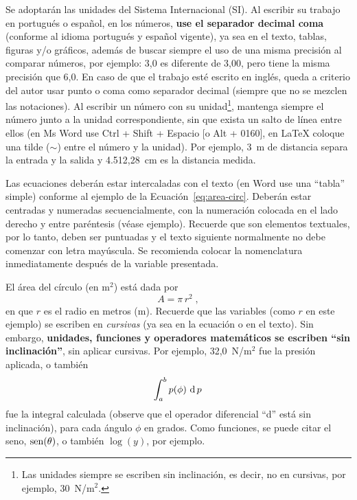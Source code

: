 Se adoptarán las unidades del Sistema Internacional (SI). Al escribir su trabajo en portugués o español, en los números, \textbf{use el separador decimal coma} (conforme al idioma portugués y español vigente), ya sea en el texto, tablas, figuras y/o gráficos, además de buscar siempre el uso de una misma precisión al comparar números, por ejemplo: 3,0 es diferente de 3,00, pero tiene la misma precisión que 6,0.
En caso de que el trabajo esté escrito en inglés, queda a criterio del autor usar punto o coma como separador decimal (siempre que no se mezclen las notaciones).
Al escribir un número con su unidad\footnote{Las unidades siempre se escriben sin inclinación, es decir, no en cursivas, por ejemplo, 30~N/m$^2$.}, mantenga siempre el número junto a la unidad correspondiente, sin que exista un salto de línea entre ellos (en Ms Word use Ctrl + Shift + Espacio [o Alt + 0160], en \LaTeX\xspace coloque una tilde ($\sim$) entre el número y la unidad). Por ejemplo, 3~m de distancia separa la entrada y la salida y 4.512,28~cm es la distancia medida.

Las ecuaciones deberán estar intercaladas con el texto (en Word use una ``tabla'' simple) conforme al ejemplo de la Ecuación~\eqref{eq:area-circ}. Deberán estar centradas y numeradas secuencialmente, con la numeración colocada en el lado derecho y entre paréntesis (véase ejemplo). Recuerde que son elementos textuales, por lo tanto, deben ser puntuadas y el texto siguiente normalmente no debe comenzar con letra mayúscula. Se recomienda colocar la nomenclatura inmediatamente después de la variable presentada.

El área del círculo (en m$^2$) está dada por
%
\begin{equation}
	A = \pi \, r^2\;,
\label{eq:area-circ}
\end{equation}
%
en que $r$ es el radio en metros (m). Recuerde que las variables (como $r$ en este ejemplo) se escriben en \textit{cursivas} (ya sea en la ecuación o en el texto). Sin embargo, \textbf{unidades, funciones y operadores matemáticos se escriben ``sin inclinación''}, sin aplicar cursivas. Por ejemplo, 32,0~N/m$^2$ fue la presión aplicada, o también
%
\begin{equation}
	\int_a^b p(\phi)\, \operatorname{d} p\,
\label{eq:int}
\end{equation}
%
fue la integral calculada (observe que el operador diferencial ``d'' está sin inclinación), para cada ángulo $\phi$ en grados. Como funciones, se puede citar el seno, $\operatorname{sen}(\theta)$, o también $\log(y)$, por ejemplo.

